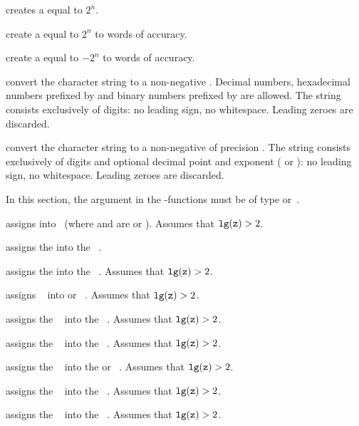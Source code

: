  creates a  equal to $2^n$.

 create a  equal to $2^n$
to  words of accuracy.

 create a  equal to $-2^n$
to  words of accuracy.

 convert the character string  to a
non-negative .
Decimal numbers, hexadecimal numbers prefixed by  and binary numbers prefixed
by  are allowed.  The string  consists exclusively of digits:
no leading sign, no whitespace. Leading zeroes are discarded.

 convert the character string  to
a non-negative  of precision . The string 
consists exclusively of digits and optional decimal point and exponent
( or ): no leading sign, no whitespace. Leading zeroes are
discarded.

In this section, the  argument in the -functions must be of type
 or~.

 assigns  into~ (where 
and  are  or ).
Assumes that ${\tt lg(z)} > 2$.

 assigns the   into the
~.

 assigns the   into the
~. Assumes that ${\tt lg(z)} > 2$.

 assigns ~ into  or
~. Assumes that ${\tt lg(z)} > 2$.

 assigns the ~ into the
~. Assumes that ${\tt lg(z)} > 2$.

 assigns the ~ into the
~. Assumes that ${\tt lg(z)} > 2$.

 assigns the ~ into the
 or ~. Assumes that ${\tt lg(z)} > 2$.

 assigns the ~ into the
~. Assumes that ${\tt lg(z)} > 2$.

 assigns the ~ into the
~. Assumes that ${\tt lg(z)} > 2$.

